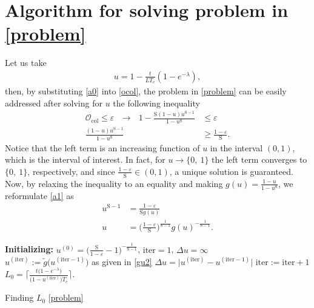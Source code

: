 \documentclass[10pt,journal,a4paper]{IEEEtran}
\begin{document}
\section{Algorithm for solving problem in \eqref{problem}}\label{App_D}
%
	Let us take 
	\begin{align}
	u=1-\frac{t}{LT_c}(1-e^{-\lambda}),\label{a0}
	\end{align}
	then, by substituting \eqref{a0} into \eqref{ocol}, the problem in \eqref{problem} can be easily addressed after solving for $u$ the following inequality
	\begin{align}
\mathcal{O}_\mathrm{col}\le \varepsilon\ \ \ \rightarrow\ \ \ 
1-\frac{\mathrm{S}(1-u)u^{\mathrm{S}-1}}{1-u^\mathrm{S}}&\le \varepsilon\nonumber\\
\frac{(1-u)u^{\mathrm{S}-1}}{1-u^\mathrm{S}}&\ge \frac{1-\varepsilon}{\mathrm{S}}.\label{a1}
\end{align}
	Notice that the left term is an increasing function of $u$ in the interval $(0,1)$, which is the interval of interest. In fact, for $u\rightarrow \{0,\ 1\}$ the left term converges to $\{0,\ 1\}$, respectively, and since $\frac{1-\varepsilon}{\mathrm{S}}\in (0,1)$, a unique solution is guaranteed.
	Now, by relaxing the inequality to an equality and making $g(u)=\frac{1-u}{1-u^\mathrm{S}}$, we reformulate \eqref{a1} as
\begin{align}
u^{\mathrm{S}-1}&=\frac{1-\varepsilon}{\mathrm{S}g(u)}\nonumber\\
u&=\Big(\frac{1-\varepsilon}{\mathrm{S}}\Big)^{\frac{1}{\mathrm{S}-1}}g(u)^{-\frac{1}{\mathrm{S}-1}}.\label{gu}
\end{align}
%
	\begin{algorithm}[t!]
	\Output{$L_0$, $\mathrm{iter}$}
	\textbf{Initializing:}\label{lin0} $u^{(0)}=\big(\frac{\mathrm{S}}{1-\varepsilon}-1\big)^{-\frac{1}{\mathrm{S}-1}}$, $\mathrm{iter}=1$, $\Delta u=\infty$\\
	\While{$\Delta u>u_\epsilon$}
	{
		$u^{(\mathrm{iter})}:=\tilde{g}\big(u^{(\mathrm{iter}-1)}\big)$ as given in \eqref{gu2}\;	
		$\Delta u=\big|u^{(\mathrm{iter})}-u^{(\mathrm{iter}-1)}\big|$\;
		$\mathrm{iter}:=\mathrm{iter}+1$\;
	}
	{
		$L_0=\bigg\lceil \frac{t\big(1-e^{-\lambda}\big)}{\big(1-u^{(\mathrm{iter})}\big)T_c} \bigg\rceil$.\label{linF}
	}   
	\caption{Finding $L_0$ \eqref{problem}}
\end{algorithm}
\end{document}
